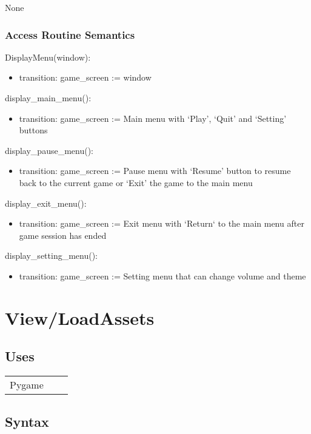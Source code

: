 \documentclass[12pt]{article}
\begin{document}
None

\subsubsection* {Access Routine Semantics}

DisplayMenu(window):
\begin{itemize}
    \item transition: game\_screen := window
\end{itemize}

\noindent display\_main\_menu():
\begin{itemize}
    \item transition: game\_screen := Main menu with `Play', `Quit' and `Setting' buttons 
\end{itemize}

\noindent display\_pause\_menu():
\begin{itemize}
    \item transition: game\_screen := Pause menu with `Resume' button to resume back to the current game or `Exit' the  game to the main menu
\end{itemize}

\noindent display\_exit\_menu():
\begin{itemize}
    \item transition: game\_screen := Exit menu with `Return` to the main menu after game session has ended 
\end{itemize}

\noindent display\_setting\_menu():
\begin{itemize}
    \item transition: game\_screen := Setting menu that can change volume and theme
\end{itemize}
\newpage
\section*{View/LoadAssets}

\subsection* {Uses}

\begin{tabular}{lll}
    Pygame
\end{tabular}

\subsection* {Syntax}
\end{document}
